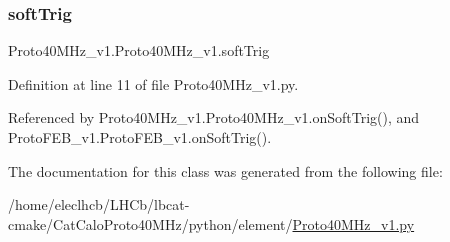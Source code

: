 \subsubsection{\texorpdfstring{soft\+Trig}{softTrig}}
{\footnotesize\ttfamily Proto40\+M\+Hz\+\_\+v1.\+Proto40\+M\+Hz\+\_\+v1.\+soft\+Trig}



Definition at line 11 of file Proto40\+M\+Hz\+\_\+v1.\+py.



Referenced by Proto40\+M\+Hz\+\_\+v1.\+Proto40\+M\+Hz\+\_\+v1.\+on\+Soft\+Trig(), and Proto\+F\+E\+B\+\_\+v1.\+Proto\+F\+E\+B\+\_\+v1.\+on\+Soft\+Trig().



The documentation for this class was generated from the following file\+:\begin{DoxyCompactItemize}
\item 
/home/eleclhcb/\+L\+H\+Cb/lbcat-\/cmake/\+Cat\+Calo\+Proto40\+M\+Hz/python/element/\hyperlink{Proto40MHz__v1_8py}{Proto40\+M\+Hz\+\_\+v1.\+py}\end{DoxyCompactItemize}
